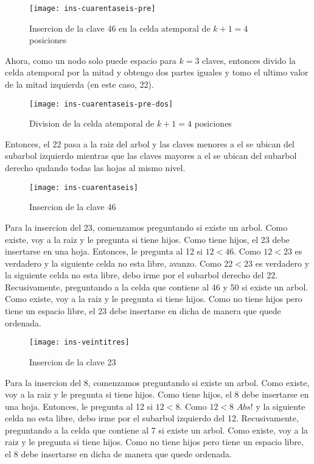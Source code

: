 \documentclass[10pt,a4paper]{article}
\begin{document}
\begin{figure}[h]
\centering
\texttt{[image: ins-cuarentaseis-pre]}
\caption{Insercion de la clave 46 en la celda atemporal de $k+1 = 4$ posiciones}
\label{drivers1}
\end{figure}
\newpage

Ahora, como un nodo solo puede espacio para $k = 3$ claves, entonces divido la celda atemporal por la mitad y obtengo dos partes iguales y tomo el ultimo valor de la mitad izquierda (en este caso, 22).

\begin{figure}[h]
\centering
\texttt{[image: ins-cuarentaseis-pre-dos]}
\caption{Division de la celda atemporal de $k+1 = 4$ posiciones}
\label{drivers1}
\end{figure}

Entonces, el 22 pasa a la raiz del arbol y las claves menores a el se ubican del subarbol izquierdo mientras que las claves mayores a el se ubican del subarbol derecho qudando todas las hojas al mismo nivel.

\begin{figure}[h]
\centering
\texttt{[image: ins-cuarentaseis]}
\caption{Insercion de la clave 46}
\label{drivers1}
\end{figure}

Para la insercion del 23, comenzamos preguntando si existe un arbol. Como existe, voy a la raiz y le pregunta si tiene hijos. Como tiene hijos, el 23 debe insertarse en una hoja. Entonces, le pregunta al 12 si $12 < 46$.
\newline
\newline
Como $12 < 23$ es verdadero y la siguiente celda no esta libre, avanzo. Como $22 < 23$ es verdadero y la siguiente celda no esta libre, debo irme por el subarbol derecho del 22. Recusivamente, preguntando a la celda que contiene al 46 y 50 si existe un arbol. Como existe, voy a la raiz y le pregunta si tiene hijos. Como no tiene hijos pero tiene un espacio libre, el 23 debe insertarse en dicha de manera que quede ordenada.

\begin{figure}[h]
\centering
\texttt{[image: ins-veintitres]}
\caption{Insercion de la clave 23}
\label{drivers1}
\end{figure}
\newpage

Para la insercion del 8, comenzamos preguntando si existe un arbol. Como existe, voy a la raiz y le pregunta si tiene hijos. Como tiene hijos, el 8 debe insertarse en una hoja. Entonces, le pregunta al 12 si $12 < 8$.
\newline
\newline
Como $12 < 8$ $Abs!$ y la siguiente celda no esta libre, debo irme por el subarbol izquierdo del 12. Recusivamente, preguntando a la celda que contiene al 7 si existe un arbol. Como existe, voy a la raiz y le pregunta si tiene hijos. Como no tiene hijos pero tiene un espacio libre, el 8 debe insertarse en dicha de manera que quede ordenada.
\end{document}
